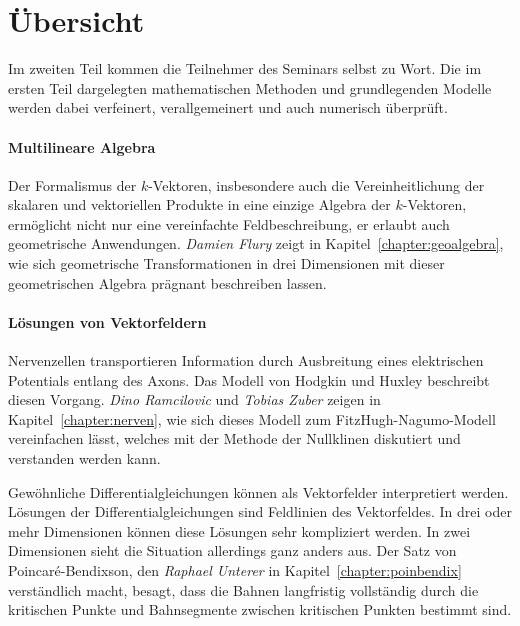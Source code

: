 %
%
%
\chapter*{Übersicht}
\fancyhead[RE]{}
\label{buch:uebersicht}
Im zweiten Teil kommen die Teilnehmer des Seminars selbst zu Wort.
Die im ersten Teil dargelegten mathematischen Methoden und
grundlegenden Modelle werden dabei verfeinert, verallgemeinert
und auch numerisch überprüft.

%
%
\subsubsection{Multilineare Algebra}

%
%
Der Formalismus der $k$-Vektoren, insbesondere auch die Vereinheitlichung
der skalaren und vektoriellen Produkte in eine einzige Algebra der
$k$-Vektoren, ermöglicht nicht nur eine vereinfachte Feldbeschreibung,
er erlaubt auch geometrische Anwendungen.
\emph{Damien Flury} zeigt in Kapitel~\ref{chapter:geoalgebra}, wie
%
%
sich geometrische Transformationen in drei Dimensionen mit dieser 
%
geometrischen Algebra prägnant beschreiben lassen.

%
%
\subsubsection{Lösungen von Vektorfeldern}

%
%
Nervenzellen transportieren Information durch Ausbreitung eines
%
elektrischen Potentials entlang des Axons.
%
Das Modell von Hodgkin und Huxley beschreibt diesen Vorgang.
%
\emph{Dino Ramcilovic}
%
%
und
\emph{Tobias Zuber}
%
%
zeigen in Kapitel~\ref{chapter:nerven}, wie sich dieses Modell
zum FitzHugh-Nagumo-Modell vereinfachen lässt, welches mit der
%
Methode der Nullklinen diskutiert und verstanden werden kann.
%

%
%
Gewöhnliche Differentialgleichungen können als Vektorfelder interpretiert
werden.
Lösungen der Differentialgleichungen sind Feldlinien des Vektorfeldes.
In drei oder mehr Dimensionen können diese Lösungen sehr kompliziert
werden.
In zwei Dimensionen sieht die Situation allerdings ganz anders aus.
Der Satz von Poincaré-Bendixson, den 
%
\emph{Raphael Unterer}
%
%
in Kapitel~\ref{chapter:poinbendix} verständlich macht, besagt, dass
die Bahnen langfristig vollständig durch die kritischen Punkte
%
und Bahnsegmente zwischen kritischen Punkten bestimmt sind.

